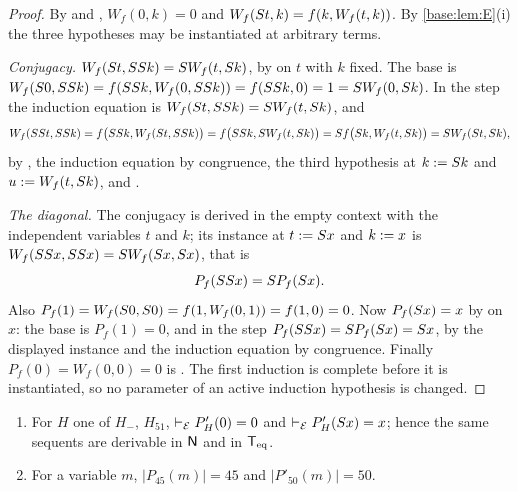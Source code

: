 \begin{proof}
By  and , $W_f(0,k)=0$ and
$W_f(S t,k)=f(k,W_f(t,k))$.  By \cref{base:lem:E}(i) the three
hypotheses may be instantiated at arbitrary terms.

\emph{Conjugacy.}  $W_f(S t,SS k)=S W_f(t,S k)$, by
 on $t$ with $k$ fixed.  The base is
$W_f(S 0,SS k)=f(SS k,W_f(0,SS k))=f(SS k,0)=1
 =S W_f(0,S k)$.  In the step the induction equation is
$W_f(S t,SS k)=S W_f(t,S k)$, and
\[
 W_f(SS t,SS k)=f\bigl(SS k,W_f(S t,SS k)\bigr)
 =f\bigl(SS k,S W_f(t,S k)\bigr)
 =S f\bigl(S k,W_f(t,S k)\bigr)=S W_f(S t,S k),
\]
by , the induction equation by congruence, the third hypothesis
at $k\mathrel{:=}S k$ and $u\mathrel{:=} W_f(t,S k)$, and .

\emph{The diagonal.}  The conjugacy is derived in the empty context with the
independent variables $t$ and $k$; its instance at $t\mathrel{:=}S x$ and
$k\mathrel{:=} x$ is $W_f(SS x,SS x)=S W_f(S x,S x)$, that is
\[
 P_f(SS x)=S P_f(S x).
\]
Also $P_f(1)=W_f(S 0,S 0)=f(1,W_f(0,1))=f(1,0)=0$.  Now
$P_f(S x)=x$ by  on $x$: the base is $P_f(1)=0$, and in the
step $P_f(SS x)=S P_f(S x)=S x$, by the displayed instance
and the induction equation by congruence.  Finally $P_f(0)=W_f(0,0)=0$ is
.  The first induction is complete before it is instantiated,
so no parameter of an active induction hypothesis is changed.
\end{proof}

\begin{proposition}
\label{base:prop:pred45}
\begin{enumerate}[label=\textup{(\roman*)}]
\item For $H$ one of $H_-$, $H_{51}$, $\vdash_{\mathcal E}P'_H(0)=0$ and
 $\vdash_{\mathcal E}P'_H(S x)=x$; hence the same sequents are derivable
 in $\mathsf{N}$ and in $\mathsf{T}_{\mathrm{eq}}$.
\item For a variable $m$, $|P_{45}(m)|=45$ and $|P'_{50}(m)|=50$.
\end{enumerate}
\end{proposition}

